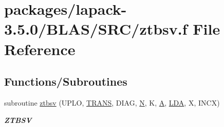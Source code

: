 \hypertarget{lapack-3_85_80_2BLAS_2SRC_2ztbsv_8f}{}\section{packages/lapack-\/3.5.0/\+B\+L\+A\+S/\+S\+R\+C/ztbsv.f File Reference}
\label{lapack-3_85_80_2BLAS_2SRC_2ztbsv_8f}
\subsection*{Functions/\+Subroutines}
\begin{DoxyCompactItemize}
\item 
subroutine \hyperlink{group__complex16__blas__level2_ga20d3fa0fe7cc708608dc658c743bfcab}{ztbsv} (U\+P\+L\+O, \hyperlink{superlu__enum__consts_8h_a0c4e17b2d5cea33f9991ccc6a6678d62a1f61e3015bfe0f0c2c3fda4c5a0cdf58}{T\+R\+A\+N\+S}, D\+I\+A\+G, \hyperlink{polmisc_8c_a0240ac851181b84ac374872dc5434ee4}{N}, K, \hyperlink{classA}{A}, \hyperlink{example__user_8c_ae946da542ce0db94dced19b2ecefd1aa}{L\+D\+A}, X, I\+N\+C\+X)
\begin{DoxyCompactList}\small\item\em {\bfseries Z\+T\+B\+S\+V} \end{DoxyCompactList}\end{DoxyCompactItemize}
